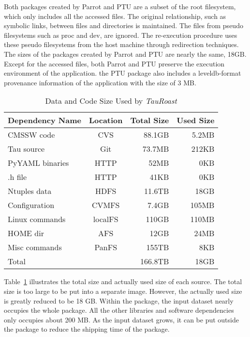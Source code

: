 Both packages created by Parrot and PTU are a subset of the root filesystem, which only includes all the accessed files. The original relationship, such as symbolic links, between files and directories is maintained. The files from pseudo filesystems such as proc and dev, are ignored. The re-execution procedure uses these pseudo filesystems from the host machine through redirection techniques.
The sizes of the packages created by Parrot and PTU are nearly the same, 18GB. 
Except for the accessed files, both Parrot and PTU preserve the execution environment of the application. 
the PTU package also includes a leveldb-format provenance information of the application with the size of 3 MB.

\begin{table}
\small
	\centering
	    \begin{tabular}{lcrr}
	        \hline
	        \bf Dependency Name & \bf Location & \bf Total Size &  \bf Used Size\\ 
	        \hline
	        CMSSW code     & CVS & 88.1GB &  5.2MB\\ \hline
	        Tau source       & Git & 73.7MB & 212KB \\ \hline
	        PyYAML binaries    & HTTP & 52MB& 0KB \\ \hline
	        .h file       & HTTP& 41KB & 0KB \\ \hline 
	        Ntuples data    & HDFS& 11.6TB & 18GB \\ \hline
	        Configuration & CVMFS & 7.4GB & 105MB \\ \hline
	        Linux commands & localFS & 110GB & 110MB \\ \hline     
	        HOME dir& AFS &12GB & 24MB\\ \hline
	        Misc commands & PanFS & 155TB & 8KB \\ \hline
	        Total      &    & 166.8TB     &  18GB \\ \hline
	    \end{tabular}
	    \normalsize
	    \caption{Data and Code Size Used by \emph{TauRoast}}
	    \label{table:size-original-real}
\end{table}
	   
Table~\ref{table:size-original-real} illustrates the total size and actually used size of each source.
The total size is too large to be put into a separate image. However, the actually used size is greatly reduced to be 18 GB.
Within the package, the input dataset nearly occupies the whole package. All the other libraries and software dependencies only occupies about 200 MB.
As the input dataset grows, it can be put outside the package to reduce the shipping time of the package.

